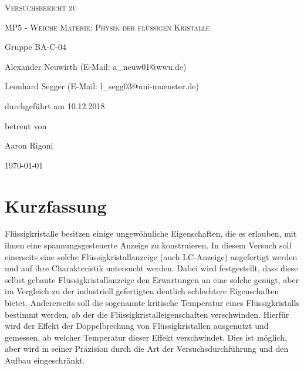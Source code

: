 \documentclass[
	a4paper,
	12pt,
	pagesize,
	ngerman
]{scrartcl}
\begin{document}
	\begin{titlepage}
		\centering
		{\scshape\LARGE Versuchsbericht zu \par}
		\vspace{1cm}
		{\scshape\huge MP5 - Weiche Materie: Physik der
flüssigen Kristalle \par} %
		\vspace{2.5cm}
		{\LARGE Gruppe BA-C-04 \par}
		\vspace{0.5cm}

		{\large Alexander Neuwirth (E-Mail: a\_neuw01@wwu.de) \par}
		{\large Leonhard Segger (E-Mail: l\_segg03@uni-muenster.de) \par}
		\vfill

		durchgeführt am 10.12.2018\par
		betreut von\par
		{\large Aaron Rigoni}

		\vfill

		{\large \today\par}
	\end{titlepage}
	\tableofcontents
	\newpage


	\section{Kurzfassung}
	Flüssigkristalle besitzen einige ungewöhnliche Eigenschaften, die es erlauben, mit ihnen eine spannungsgesteuerte Anzeige zu konstruieren.
	In diesem Versuch soll einerseits eine solche Flüssigkristallanzeige (auch LC-Anzeige) angefertigt werden und auf ihre Charakteristik untersucht werden.
	Dabei wird festgestellt, dass diese selbst gebaute Flüssigkristallanzeige den Erwartungen an eine solche genügt, aber im Vergleich zu der industriell gefertigten deutlich schlechtere Eigenschaften bietet.
	Andererseits soll die sogenannte kritische Temperatur eines Flüssigkristalls bestimmt werden, ab der die Flüssigkristalleigenschaften verschwinden.
	Hierfür wird der Effekt der Doppelbrechung von Flüssigkristallen ausgenutzt und gemessen, ab welcher Temperatur dieser Effekt verschwindet.
	Dies ist möglich, aber wird in seiner Präzision durch die Art der Versuchsdurchführung und den Aufbau eingeschränkt.
\end{document}
